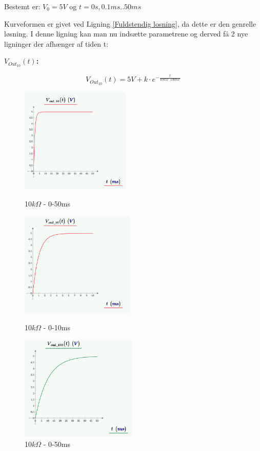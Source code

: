 Bestemt er:
$V_{0}=5V$ og $t=0s,0.1ms..50ms$

Kurveformen er givet ved Ligning \ref{Fuldstendig losning}, da dette er den genrelle løsning. I denne ligning kan man nu indsætte parametrene og derved få 2 nye ligninger der afhænger af tiden t:

\textbf{$V_{Out_{10}}(t)$:}
\begin{center}
\begin{equation}
V_{Out_{10}}(t) = 5V+k \cdot e^{-\frac{t}{10k\Omega \cdot 100nF}} 
\label{V_Out_10}
\end{equation}
\end{center}



\begin{figure}
  \begin{minipage}[b]{0.4\textwidth}
   \includegraphics[height=5cm]{M_Fig/V_out_10_1}
\caption{10$k\Omega$ - 0-50ms}
\label{10kOhm50ms}
  \end{minipage}
 
  \begin{minipage}[c]{0.4\textwidth}
 \includegraphics[height=5cm]{M_Fig/V_out_10_2}
\caption{10$k\Omega$ - 0-10ms}
\label{10kOhm10ms}
  \end{minipage}
  
  
   \begin{minipage}[]{0.4\textwidth}
 \includegraphics[height=5cm]{M_Fig/V_out_100_1}
\caption{10$k\Omega$ - 0-50ms}
\label{100kOhm50ms}
  \end{minipage}
\end{figure}







